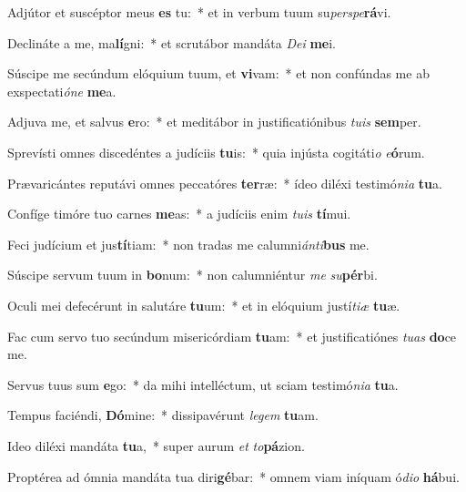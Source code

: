 \item Adjútor et suscéptor meus \textbf{es} tu:~* et in verbum tuum su\textit{per}\textit{spe}\textbf{rá}vi.
\item Declináte a me, ma\textbf{lí}gni:~* et scrutábor mandáta \textit{De}\textit{i} \textbf{me}i.
\item Súscipe me secúndum elóquium tuum, et \textbf{vi}vam:~* et non confúndas me ab exspectati\textit{ó}\textit{ne} \textbf{me}a.
\item Adjuva me, et salvus \textbf{e}ro:~* et meditábor in justificatiónibus \textit{tu}\textit{is} \textbf{sem}per.
\item Sprevísti omnes discedéntes a judíciis \textbf{tu}is:~* quia injústa cogitáti\textit{o} \textit{e}\textbf{ó}rum.
\item Prævaricántes reputávi omnes peccatóres \textbf{ter}ræ:~* ídeo diléxi testimó\textit{ni}\textit{a} \textbf{tu}a.
\item Confíge timóre tuo carnes \textbf{me}as:~* a judíciis enim \textit{tu}\textit{is} \textbf{tí}mui.
\item Feci judícium et jus\textbf{tí}tiam:~* non tradas me calumni\textit{án}\textit{ti}\textbf{bus} me.
\item Súscipe servum tuum in \textbf{bo}num:~* non calumniéntur \textit{me} \textit{su}\textbf{pér}bi.
\item Oculi mei defecérunt in salutáre \textbf{tu}um:~* et in elóquium justí\textit{ti}\textit{æ} \textbf{tu}æ.
\item Fac cum servo tuo secúndum misericórdiam \textbf{tu}am:~* et justificatiónes \textit{tu}\textit{as} \textbf{do}ce me.
\item Servus tuus sum \textbf{e}go:~* da mihi intelléctum, ut sciam testimó\textit{ni}\textit{a} \textbf{tu}a.
\item Tempus faciéndi, \textbf{Dó}mine:~* dissipavérunt \textit{le}\textit{gem} \textbf{tu}am.
\item Ideo diléxi mandáta \textbf{tu}a,~* super aurum \textit{et} \textit{to}\textbf{pá}zion.
\item Proptérea ad ómnia mandáta tua diri\textbf{gé}bar:~* omnem viam iníquam ó\textit{di}\textit{o} \textbf{há}bui.
